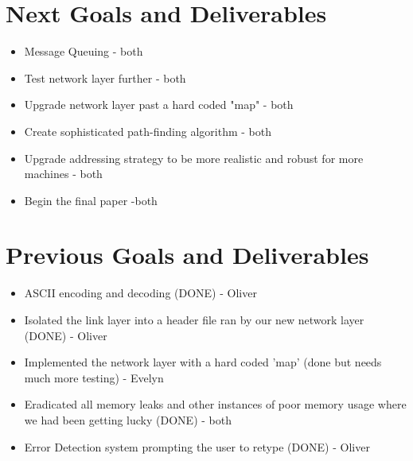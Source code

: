 \documentclass{article}
\begin{document}
\section*{Next Goals and Deliverables}
\begin{itemize}
\item Message Queuing - both
\item Test network layer further - both
\item Upgrade network layer past a hard coded "map" - both
\item Create sophisticated path-finding algorithm - both
\item Upgrade addressing strategy to be more realistic and robust for more machines - both
\item Begin the final paper -both
\end{itemize}
\section*{Previous Goals and Deliverables}
\begin{itemize}
\item ASCII encoding and decoding (DONE) - Oliver
\item Isolated the link layer into a header file ran by our new network layer (DONE) - Oliver 
\item Implemented the network layer with a hard coded 'map' (done but needs much more testing) - Evelyn
\item Eradicated all memory leaks and other instances of poor memory usage where we had been getting lucky (DONE) - both 
\item Error Detection system prompting the user to retype (DONE) - Oliver
\end{itemize}
\end{document}
